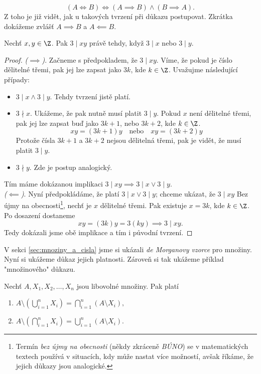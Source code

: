 \begin{equation*}
    (A \iff B) \iff (A \implies B) \land (B \implies A).
\end{equation*}
Z toho je již vidět, jak u takových tvrzení při důkazu postupovat. Zkrátka dokážeme zvlášť $A \implies B$ a $A \impliedby B$.
\begin{proposition}
    Nechť $x,y\in\Z$. Pak $3 \mid xy$ právě tehdy, když $3 \mid x$ nebo $3 \mid y$.
\end{proposition}
\begin{proof}
    \textit{($\implies$)}. Začneme s předpokladem, že $3 \mid xy$. Víme, že pokud je číslo dělitelné třemi, pak jej lze zapsat jako $3k$, kde $k\in\Z$. Uvažujme následující případy:
    \begin{itemize}
        \item $3 \mid x \land 3 \mid y$. Tehdy tvrzení jistě platí.
        \item $3 \nmid x$. Ukážeme, že pak nutně musí platit $3 \mid y$. Pokud $x$ není dělitelné třemi, pak jej lze zapsat buď jako $3k+1$, nebo $3k+2$, kde $k\in\Z$. 
        \begin{equation*}
            xy=(3k+1)y\quad\text{nebo}\quad xy=(3k+2)y
        \end{equation*}
        Protože čísla $3k+1$ a $3k+2$ nejsou dělitelná třemi, pak je vidět, že musí platit $3 \mid y$.
        \item $3 \nmid y$. Zde je postup analogický. 
    \end{itemize}
    Tím máme dokázanou implikaci $3 \mid xy \implies 3 \mid x \lor 3 \mid y$.\\
    \textit{($\impliedby$)}. Nyní předpokládáme, že platí $3 \mid x \lor 3 \mid y$; chceme ukázat, že $3 \mid xy$ Bez újmy na obecnosti\footnote{Termín \emph{bez újmy na obecnosti} (někdy zkráceně \emph{BÚNO}) se v matematických textech používá v situacích, kdy může nastat více možností, avšak říkáme, že jejich důkazy jsou analogické.}, nechť je $x$ dělitelné třemi. Pak existuje $x=3k$, kde $k\in\Z$. Po dosazení dostaneme
    \begin{equation*}
        xy=(3k)y=3(ky) \implies 3 \mid xy.
    \end{equation*}
    Tedy dokázali jsme obě implikace a tím i původní tvrzení.
\end{proof}
V sekci \ref{sec:mnoziny_a_cisla} jsme si ukázali \emph{de Morganovy vzorce} pro množiny. Nyní si ukážeme důkaz jejich platnosti. Zároveň si tak ukážeme příklad "množinového" důkazu.
\begin{proposition}
    Nechť $A,X_1,X_2,\dots,X_n$ jsou libovolné množiny. Pak platí
    \begin{enumerate}[label=(\roman*)]
        \item\label{item:de_morgan_sets_1} $\displaystyle A \setminus \left(\bigcup\limits_{i=1}^{n}{X_i}\right)=\bigcap\limits_{i=1}^{n}{(A \setminus X_i)},$
        \item\label{item:de_morgan_sets_2} $\displaystyle A \setminus \left(\bigcap\limits_{i=1}^{n}{X_i}\right)=\bigcup\limits_{i=1}^{n}{(A \setminus X_i)}.$
    \end{enumerate}
\end{proposition}
